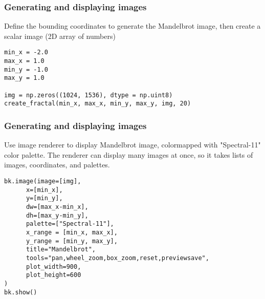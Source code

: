\begin{frame}[fragile] \frametitle{Generating and displaying images}
Define the bounding coordinates to generate the Mandelbrot image, then create a scalar image (2D array of numbers)
\begin{lstlisting}
min_x = -2.0
max_x = 1.0
min_y = -1.0
max_y = 1.0

img = np.zeros((1024, 1536), dtype = np.uint8)
create_fractal(min_x, max_x, min_y, max_y, img, 20)
\end{lstlisting}
\end{frame}

\begin{frame}[fragile] \frametitle{Generating and displaying images}
Use image renderer to display Mandelbrot image, colormapped with "Spectral-11" color palette. The renderer can display many images at once, so it takes lists of images, coordinates, and palettes.
\begin{lstlisting}
bk.image(image=[img],
      x=[min_x],
      y=[min_y],
      dw=[max_x-min_x],
      dh=[max_y-min_y],
      palette=["Spectral-11"],
      x_range = [min_x, max_x],
      y_range = [min_y, max_y],
      title="Mandelbrot",
      tools="pan,wheel_zoom,box_zoom,reset,previewsave",
      plot_width=900,
      plot_height=600
)
bk.show()
\end{lstlisting}
\end{frame}









